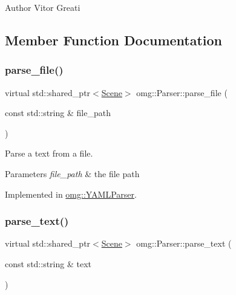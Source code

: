 \begin{DoxyAuthor}{Author}
Vitor Greati 
\end{DoxyAuthor}


\subsection{Member Function Documentation}
\mbox{\label{classomg_1_1_parser_a327a60ea0092d0b969a3ec393248ca8f}} 
\subsubsection{\texorpdfstring{parse\_file()}{parse\_file()}}
{\footnotesize\ttfamily virtual std\+::shared\+\_\+ptr$<$\mbox{\hyperlink{classomg_1_1_scene}{Scene}}$>$ omg\+::\+Parser\+::parse\+\_\+file (\begin{DoxyParamCaption}\item[{const std\+::string \&}]{file\+\_\+path }\end{DoxyParamCaption})\hspace{0.3cm}{\ttfamily [pure virtual]}}



Parse a text from a file. 


\begin{DoxyParams}{Parameters}
{\em file\+\_\+path} & the file path \\
\hline
\end{DoxyParams}


Implemented in \mbox{\hyperlink{classomg_1_1_y_a_m_l_parser_ab569d1029cec7dc2cb91eb0e08f5bc37}{omg\+::\+Y\+A\+M\+L\+Parser}}.

\mbox{\label{classomg_1_1_parser_a50199f934cb3471777cb859a7289739f}} 
\subsubsection{\texorpdfstring{parse\_text()}{parse\_text()}}
{\footnotesize\ttfamily virtual std\+::shared\+\_\+ptr$<$\mbox{\hyperlink{classomg_1_1_scene}{Scene}}$>$ omg\+::\+Parser\+::parse\+\_\+text (\begin{DoxyParamCaption}\item[{const std\+::string \&}]{text }\end{DoxyParamCaption})\hspace{0.3cm}{\ttfamily [pure virtual]}}



